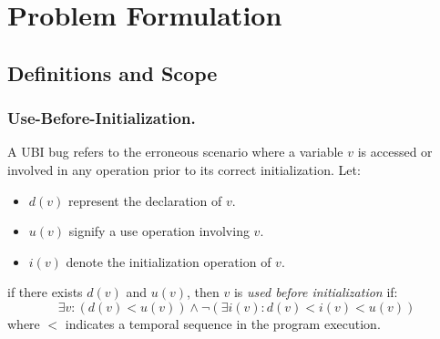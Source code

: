 
\section{Problem Formulation}
\label{sec:problem}

\subsection{Definitions and Scope}


\subsubsection{Use-Before-Initialization.} A \acf{UBI} bug refers to the erroneous scenario where a variable \( v \) is accessed or involved in any operation prior to its correct initialization. 
Let:

\begin{itemize}
\item 
\(d(v)\) represent the declaration of \(v\).
\item 
\(u(v)\) signify a use operation involving \(v\).
\item 
\(i(v)\) denote the initialization operation of \(v\).
\end{itemize}

if there exists \(d(v)\) and \(u(v)\), then \(v\) is \textit{used before initialization} if:
\begin{equation}
\exists v : (d(v) < u(v)) \land \neg (\exists i(v) : d(v) < i(v) < u(v))
\label{eq:ubi_def}
\end{equation}
where \( < \) indicates a temporal sequence in the program execution. 



